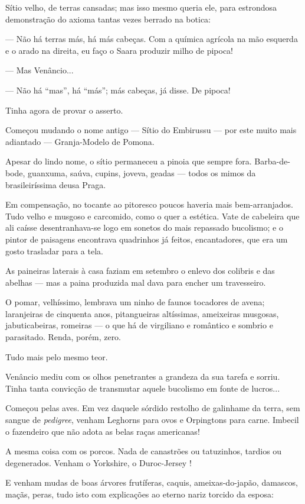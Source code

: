 Sítio velho, de terras cansadas; mas isso mesmo queria ele, para
estrondosa demonstração do axioma tantas vezes berrado na botica:

--- Não há terras más, há más cabeças. Com a química agrícola na mão
esquerda e o arado na direita, eu faço o Saara produzir milho de pipoca!

--- Mas Venâncio...

--- Não há ``mas'', há ``más''; más cabeças, já disse. De pipoca!

Tinha agora de provar o asserto.

Começou mudando o nome antigo --- Sítio do Embirussu --- por este muito
mais adiantado --- Granja-Modelo de Pomona.

Apesar do lindo nome, o sítio permaneceu a pinoia que sempre fora.
Barba-de-bode, guanxuma, saúva, cupins, joveva, geadas --- todos os
mimos da brasileiríssima deusa Praga.

Em compensação, no tocante ao pitoresco poucos haveria mais
bem-arranjados. Tudo velho e musgoso e carcomido, como o quer a
estética. Vate de cabeleira que ali caísse desentranhava-se logo em
sonetos do mais repassado bucolismo; e o pintor de paisagens encontrava
quadrinhos já feitos, encantadores, que era um gosto trasladar para a
tela.

As paineiras laterais à casa faziam em setembro o enlevo dos colibris e
das abelhas --- mas a paina produzida mal dava para encher um
travesseiro.

O pomar, velhíssimo, lembrava um ninho de faunos tocadores de avena;
laranjeiras de cinquenta anos, pitangueiras altíssimas, ameixeiras
musgosas, jabuticabeiras, romeiras --- o que há de virgiliano e
romântico e sombrio e parasitado. Renda, porém, zero.

Tudo mais pelo mesmo teor.

Venâncio mediu com os olhos penetrantes a grandeza da sua tarefa e
sorriu. Tinha tanta convicção de transmutar aquele bucolismo em fonte de
lucros...

Começou pelas aves. Em vez daquele sórdido restolho de galinhame da
terra, sem sangue de \emph{pedigree}, venham Leghorns para ovos e
Orpingtons para carne. Imbecil o fazendeiro que não adota as belas raças
americanas!

A mesma coisa com os porcos. Nada de canastrões ou tatuzinhos, tardios
ou degenerados. Venham o Yorkshire, o Duroc-Jersey !

E venham mudas de boas árvores frutíferas, caquis, ameixas-do-japão,
damascos, maçãs, peras, tudo isto com explicações ao eterno nariz
torcido da esposa:


